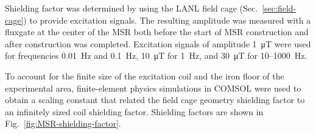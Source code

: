 Shielding factor was determined by using the LANL field cage (Sec.~\ref{sec:field-cage}) to provide excitation signals. The resulting amplitude was measured with a fluxgate at the center of the MSR both before the start of MSR construction and after construction was completed. Excitation signals of amplitude \qty{1}{\micro\tesla} were used for frequencies \qty{0.01}{\hertz} and \qty{0.1}{\hertz}, \qty{10}{\micro\tesla} for \qty{1}{\hertz}, and \qty{30}{\micro\tesla} for 10--\qty{1000}{\hertz}.

To account for the finite size of the excitation coil and the iron floor of the experimental area, finite-element physics simulations in COMSOL were used to obtain a scaling constant that related the field cage geometry shielding factor to an infinitely sized coil shielding factor. Shielding factors are shown in Fig.~\ref{fig:MSR-shielding-factor}. 

